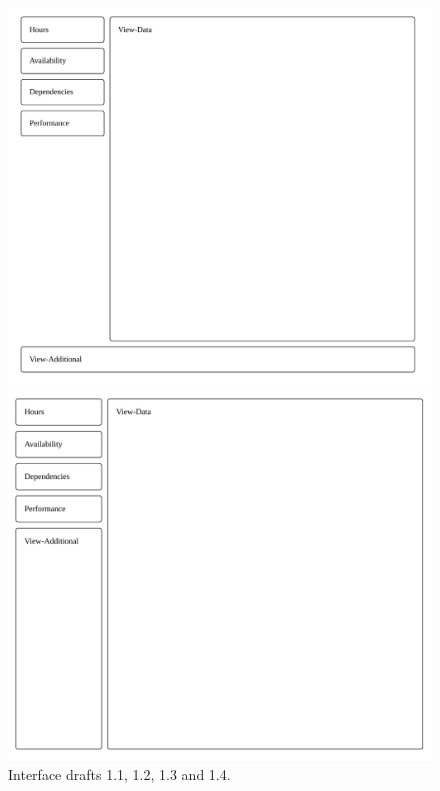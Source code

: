 \documentclass[nofilelist,dvipsnames]{cslthse-msc}
\begin{document}
\begin{figure}[h!]
\begin{minipage}{.49\textwidth}
          \end{minipage}
          \begin{minipage}{.49\textwidth}
            \includegraphics[width=\linewidth]{ui13.pdf}
          \end{minipage}
          \begin{minipage}{.49\textwidth}
            \includegraphics[width=\linewidth]{ui14.pdf}
          \end{minipage}
          \caption{Interface drafts 1.1, 1.2, 1.3 and 1.4.}
        \end{figure}
\end{document}
